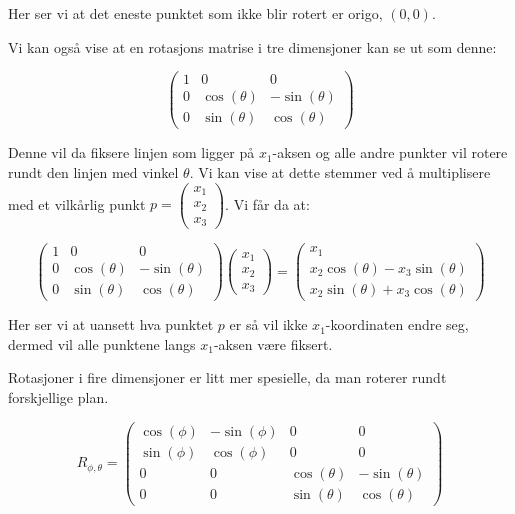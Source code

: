 \documentclass[a4paper,10pt,english]{article}
\begin{document}
    Her ser vi at det eneste punktet som ikke blir rotert er origo, $\left( 0, 0 \right)$.

    Vi kan også vise at en rotasjons matrise i tre dimensjoner kan se ut som denne:
            
    $$
    \left(
    \begin{matrix}
        1 & 0 & 0 \\
        0 & \cos(\theta) & -\sin(\theta) \\
        0 & \sin(\theta) &  \cos(\theta)
    \end{matrix}
    \right)
    $$
            
    Denne vil da fiksere linjen som ligger på $x_{1}$-aksen og alle andre punkter vil rotere rundt den linjen med vinkel $\theta$.
    Vi kan vise at dette stemmer ved å multiplisere med et vilkårlig punkt $p = \left( \begin{smallmatrix} x_{1} \\ x_{2} \\ x_{3} \end{smallmatrix} \right)$. Vi får da at:

    $$
    \left(
    \begin{matrix}
        1 & 0 & 0 \\
        0 & \cos(\theta) & -\sin(\theta) \\
        0 & \sin(\theta) &  \cos(\theta)
    \end{matrix}
    \right)
    \left(
    \begin{matrix}
        x_{1} \\ x_{2} \\ x_{3}
    \end{matrix}
    \right) =
    \left(
    \begin{matrix}
        x_{1} \\
        x_{2}\cos(\theta) - x_{3}\sin(\theta) \\
        x_{2}\sin(\theta) + x_{3}\cos(\theta)
    \end{matrix}
    \right)
    $$

    Her ser vi at uansett hva punktet $p$ er så vil ikke $x_{1}$-koordinaten endre seg, dermed vil alle punktene langs $x_{1}$-aksen være fiksert.

    Rotasjoner i fire dimensjoner er litt mer spesielle, da man roterer rundt forskjellige plan.

    $$
    R_{\phi, \theta} = \left(
    \begin{matrix}
        \cos(\phi) & -\sin(\phi) & 0 & 0 \\
        \sin(\phi) &  \cos(\phi) & 0 & 0 \\
        0 & 0 & \cos(\theta) & -\sin(\theta) \\
        0 & 0 & \sin(\theta) &  \cos(\theta)
    \end{matrix}
    \right)
    $$
\end{document}
